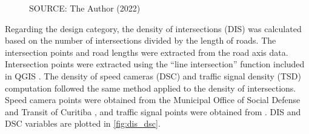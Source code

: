 \begin{figure}[!htbp]
\begin{subfigure}{0.5\textwidth}
    \end{subfigure}    
    \label{fig:pd_ldi}
    \par SOURCE: The Author (2022)
\end{figure}

Regarding the design category, the density of intersections (DIS) was calculated based on the number of intersections divided by the length of roads. The intersection points and road lengths were extracted from the \textcite{IPPUC2021} road axis data. Intersection points were extracted using the ``line intersection'' function included in QGIS \cite{QGIS_software}. The density of speed cameras (DSC) and traffic signal density (TSD) computation followed the same method applied to the density of intersections. Speed camera points were obtained from the Municipal Office of Social Defense and Transit of Curitiba \cite{SETRAN2020}, and traffic signal points were obtained from \textcite{IPPUC2021}. DIS and DSC variables are plotted in \autoref{fig:dis_dsc}. 

